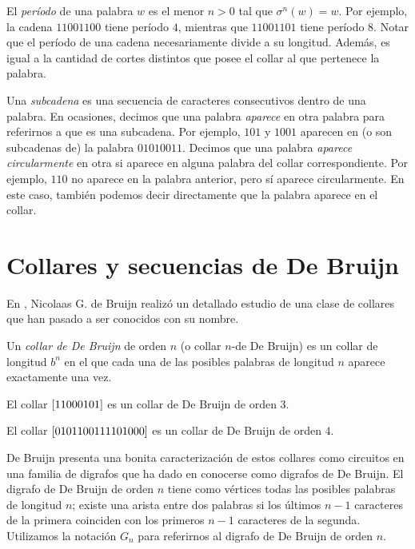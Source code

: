 El \emph{período} de una palabra $w$ es el menor $n > 0$ tal que
$\sigma^n(w) = w$. Por ejemplo, la cadena $11001100$ tiene período $4$,
mientras que $11001101$ tiene período $8$.
Notar que el período de una cadena necesariamente divide a su longitud.
Además, es igual a la cantidad de cortes distintos que posee el collar al que
pertenece la palabra.

Una \emph{subcadena} es una secuencia de caracteres consecutivos dentro de una
palabra. 
En ocasiones, decimos que una palabra \emph{aparece} en otra palabra
para referirnos a que es una subcadena. Por ejemplo, $101$ y $1001$ aparecen en
(o son subcadenas de) la palabra $01010011$. Decimos que una palabra
\emph{aparece circularmente} en otra si aparece en alguna palabra del collar
correspondiente. Por ejemplo, $110$ no aparece en la palabra anterior, pero sí
aparece circularmente. En este caso, también podemos decir directamente que
la palabra aparece en el collar.

\section{Collares y secuencias de De Bruijn}

En \cite{de-bruijn-combinatorial-problem}, Nicolaas G. de Bruijn realizó un detallado estudio de una clase
de collares que han pasado a ser conocidos con su nombre.

\begin{definition}
	Un \emph{collar de De Bruijn} de orden $n$ (o collar $n$-de De Bruijn) es un collar
	de longitud $b^n$ en el que cada una de las posibles palabras de longitud $n$ 
	aparece exactamente una vez.
\end{definition}

\begin{examples}
	El collar $\left[11000101\right]$ es un collar de De Bruijn de orden $3$.

	El collar $\left[0101100111101000\right]$ es un collar de De Bruijn de orden $4$.
\end{examples}

De Bruijn presenta una bonita caracterización de estos collares como circuitos
en una familia de digrafos que ha dado en conocerse como digrafos de De Bruijn.
El digrafo de De Bruijn de orden $n$ tiene como vértices todas las posibles
palabras de longitud $n$; existe una arista entre dos palabras si los últimos
$n-1$ caracteres de la primera coinciden con los primeros $n-1$ caracteres de la
segunda. Utilizamos la notación $G_n$ para referirnos al digrafo de De Bruijn
de orden $n$.

